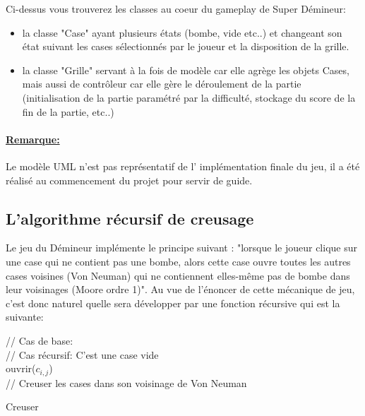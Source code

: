 \documentclass{article}
\begin{document}
Ci-dessus vous trouverez les classes au coeur du gameplay de Super Démineur: 
\begin{itemize}
    \item  la classe "Case" ayant plusieurs états (bombe, vide etc..) et changeant son état suivant les cases sélectionnés par le joueur et la disposition de la grille. 
    \item  la classe "Grille" servant à la fois de modèle car elle agrège les objets Cases, mais aussi de contrôleur car elle gère le déroulement de la partie (initialisation de la partie paramétré par la difficulté, stockage du score de la fin de la partie, etc..)
\end{itemize}

\paragraph{\underline{Remarque:}}Le modèle UML n'est pas représentatif de l' implémentation finale du jeu, il a été réalisé au commencement du projet pour servir de guide.

\subsection{L'algorithme récursif de creusage}

Le jeu du Démineur implémente le principe suivant : "lorsque le joueur clique sur une case qui ne contient pas une bombe, alors cette case ouvre toutes les autres cases voisines (Von Neuman) qui ne contiennent elles-même pas de bombe dans leur voisinages (Moore ordre 1)". 
Au vue de l'énoncer de cette mécanique de jeu, c'est donc naturel quelle sera développer par une fonction récursive qui est la suivante:\\

\begin{algorithm}[H]
	// Cas de base:\\
	// Cas récursif: C'est une case vide\\
	ouvrir($c_{i,j}$)\\
	// Creuser les cases dans son voisinage de Von Neuman\\
	\caption{Creuser}
\end{algorithm}
\end{document}
